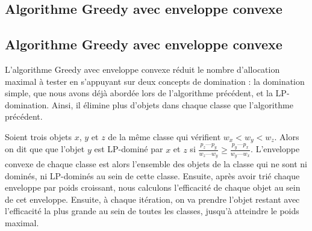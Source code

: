 \documentclass{article}
\begin{document}
\subsection{Algorithme Greedy avec enveloppe convexe}

\subsection{Algorithme Greedy avec enveloppe convexe}
L'algorithme Greedy avec enveloppe convexe réduit le nombre d'allocation maximal à tester en s'appuyant sur deux concepts de domination : la domination simple, que nous avons déjà abordée lors de l'algorithme précédent, et la LP-domination. Ainsi, il élimine plus d'objets dans chaque classe que l'algorithme précédent. 

Soient trois objets $x$, $y$ et $z$ de la même classe qui vérifient $w_{x} < w_{y} < w_{z}$. Alors on dit que que l'objet $y$ est LP-dominé par $x$ et $z$ si $\frac{p_z—p_y}{w_z—w_y} \geq \frac{p_y—p_x}{w_y—w_x}$.
L'enveloppe convexe de chaque classe est alors l'ensemble des objets de la classe qui ne sont ni dominés, ni LP-dominés au sein de cette classe. Ensuite, après avoir trié chaque enveloppe par poids croissant, nous calculons l'efficacité de chaque objet au sein de cet enveloppe. Ensuite, à chaque itération, on va prendre l'objet restant avec l'efficacité la plus grande au sein de toutes les classes, jusqu'à atteindre le poids maximal.
\end{document}
